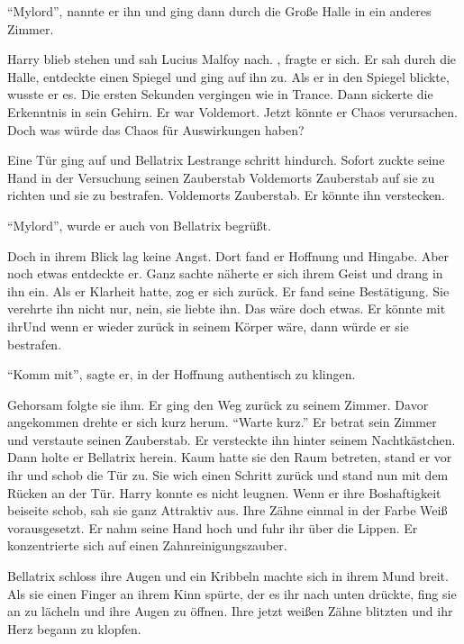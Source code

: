 \enquote{Mylord}, nannte er ihn und ging dann durch die Große Halle in ein anderes Zimmer.

Harry blieb stehen und sah Lucius Malfoy nach. , fragte er sich. Er sah durch die Halle, entdeckte einen Spiegel und ging auf ihn zu.  Als er in den Spiegel blickte, wusste er es. Die ersten Sekunden vergingen wie in Trance. Dann sickerte die Erkenntnis in sein Gehirn. Er war Voldemort. Jetzt könnte er Chaos verursachen. Doch was würde das Chaos für Auswirkungen haben?

Eine Tür ging auf und Bellatrix Lestrange schritt hindurch. Sofort zuckte seine Hand in der Versuchung seinen Zauberstab \gst Voldemorts Zauberstab \gst auf sie zu richten und sie zu bestrafen. Voldemorts Zauberstab. Er könnte ihn verstecken.

\enquote{Mylord}, wurde er auch von Bellatrix begrüßt.

Doch in ihrem Blick lag keine Angst. Dort fand er Hoffnung und Hingabe. Aber noch etwas entdeckte er. Ganz sachte näherte er sich ihrem Geist und drang in ihn ein. Als er Klarheit hatte, zog er sich zurück. Er fand seine Bestätigung. Sie verehrte ihn nicht nur, nein, sie liebte ihn. Das wäre doch etwas. Er könnte mit ihr\abs Und wenn er wieder zurück in seinem Körper wäre, dann würde er sie bestrafen.

\enquote{Komm mit}, sagte er, in der Hoffnung authentisch zu klingen.

Gehorsam folgte sie ihm. Er ging den Weg zurück zu seinem Zimmer. Davor angekommen drehte er sich kurz herum. \enquote{Warte kurz.} Er betrat sein Zimmer und verstaute seinen Zauberstab. Er versteckte ihn hinter seinem Nachtkästchen. Dann holte er Bellatrix herein. Kaum hatte sie den Raum betreten, stand er vor ihr und schob die Tür zu. Sie wich einen Schritt zurück und stand nun mit dem Rücken an der Tür. Harry konnte es nicht leugnen. Wenn er ihre Boshaftigkeit beiseite schob, sah sie ganz Attraktiv aus. Ihre Zähne einmal in der Farbe Weiß vorausgesetzt. Er nahm seine Hand hoch und fuhr ihr über die Lippen. Er konzentrierte sich auf einen Zahnreinigungszauber.

Bellatrix schloss ihre Augen und ein Kribbeln machte sich in ihrem Mund breit. Als sie einen Finger an ihrem Kinn spürte, der es ihr nach unten drückte, fing sie an zu lächeln und ihre Augen zu öffnen. Ihre jetzt weißen Zähne blitzten und ihr Herz begann zu klopfen.

